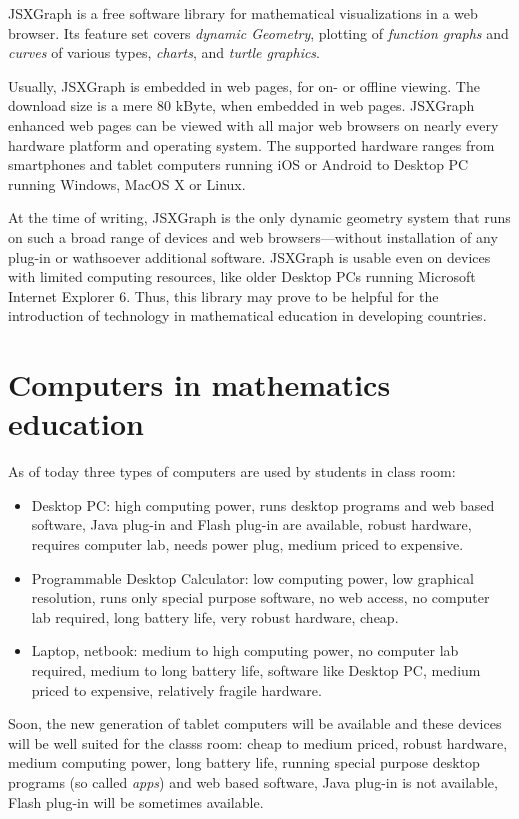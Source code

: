 \documentclass[12pt,a4paper]{article}%
\begin{document}
JSXGraph is a free software library for mathematical visualizations in a web browser.
Its feature set covers {\sl dynamic Geometry}, plotting of {\sl function graphs} and
{\sl curves} of various types, {\sl charts}, and {\sl turtle graphics}.

Usually, JSXGraph is embedded in web pages, for on- or off\/line viewing.
The download size is a mere 80 kByte, when embedded in web pages.
JSXGraph enhanced web pages can be viewed with all major web browsers 
on nearly every hardware platform and operating system.
The supported hardware ranges from smartphones and tablet computers 
running iOS or Android to Desktop PC running Windows, MacOS X or Linux.

At the time of writing, JSXGraph is the only dynamic geometry system that runs  
on such a broad range of  devices and web browsers---without installation of any plug-in 
or wathsoever additional software.
JSXGraph is usable even on devices with limited computing resources, 
like older Desktop PCs running Microsoft Internet Explorer 6. 
Thus, this library may prove to be helpful for the
introduction of technology in mathematical education in developing countries.

\section{Computers in mathematics education}
As of today three types of computers are used by students in class room:
\begin{itemize}
\item Desktop PC: high computing power, runs desktop programs and web based software, 
Java plug-in and Flash plug-in are available, robust hardware,
requires computer lab, needs power plug, medium priced to expensive.
\item Programmable Desktop Calculator: low computing power, low graphical resolution, runs only
special purpose software, no web access, no computer lab required, long battery life, 
very robust hardware, cheap.
\item Laptop, netbook: medium to high computing power, no computer lab required, 
medium to long battery life, software like Desktop PC,
medium priced to expensive, relatively fragile hardware.
\end{itemize}
Soon, the new generation of tablet computers will be available and these devices will be
well suited for the classs room: cheap to medium priced, robust hardware, medium
computing power, long battery life, running special purpose desktop programs (so called {\sl apps}) and web based software,
Java plug-in is not available, Flash plug-in will be sometimes available.
\end{document}
